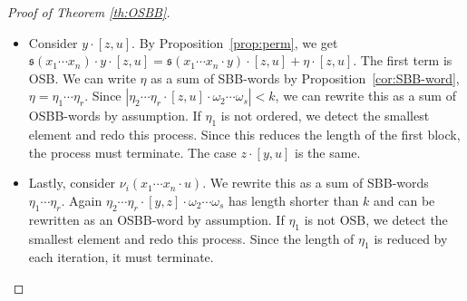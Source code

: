 \documentclass[10pt,a4paper]{amsart}
\newcommand{\s}{\ensuremath{\mathfrak{s}}}
\numberwithin{equation}{section}
\begin{document}
\begin{proof}[Proof of Theorem \ref{th:OSBB}]
\begin{itemize}
 \item Consider $y \cdot [z,u]$. By Proposition~\ref{prop:perm}, we get $\s(x_1 \cdots x_n) \cdot y \cdot [z,u] = \s(x_1 \cdots x_n \cdot y) \cdot [z,u] + \eta \cdot [z,u]$. The first term is OSB. We can write $\eta$ as a sum of SBB-words by Proposition~\ref{cor:SBB-word}, $\eta = \eta_1 \cdots \eta_r$. Since $|\eta_2 \cdots \eta_r \cdot [z,u] \cdot \omega_2 \cdots \omega_s|<k$, we can rewrite this as a sum of OSBB-words by assumption. If $\eta_1$ is not ordered, we detect the smallest element and redo this process. Since this reduces the length of the first block, the process must terminate.
 The case $z \cdot [y,u]$ is the same.
 \item Lastly, consider $\nu_i(x_1 \cdots x_n \cdot u)$. We rewrite this as a sum of SBB-words $\eta_1 \cdots \eta_r$. Again $\eta_2 \cdots \eta_r \cdot [y,z] \cdot \omega_2 \cdots \omega_s$ has length shorter than $k$ and can be rewritten as an OSBB-word by assumption. If $\eta_1$ is not OSB, we detect the smallest element and redo this process. Since the length of $\eta_1$ is reduced by each iteration, it must terminate.
 \end{itemize}


\end{proof}
\end{document}
